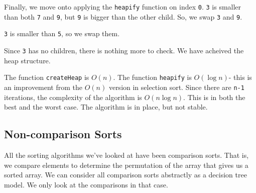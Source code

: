 \documentclass[a4paper, openany]{memoir}
\begin{document}
Finally, we move onto applying the \texttt{heapify} function on index \texttt{0}. \texttt{3} is smaller than both \texttt{7} and \texttt{9}, but \texttt{9} is bigger than the other child. So, we swap \texttt{3} and \texttt{9}.
\begin{center}
\end{center}
\texttt{3} is smaller than \texttt{5}, so we swap them.
\begin{center}
\end{center}
Since \texttt{3} has no children, there is nothing more to check. We have acheived the heap structure.

\noindent The function \texttt{createHeap} is $O(n)$. The function \texttt{heapify} is $O(\log n)$- this is an improvement from the $O(n)$ version in selection sort. Since there are \texttt{n-1} iterations, the complexity of the algorithm is $O(n \log n)$. This is in both the best and the worst case. The algorithm is in place, but not stable.

\subsection{Non-comparison Sorts}
All the sorting algorithms we've looked at have been comparison sorts. That is, we compare elements to determine the permutation of the array that gives us a sorted array. We can consider all comparison sorts abstractly as a decision tree model. We only look at the comparisons in that case. 
\end{document}
